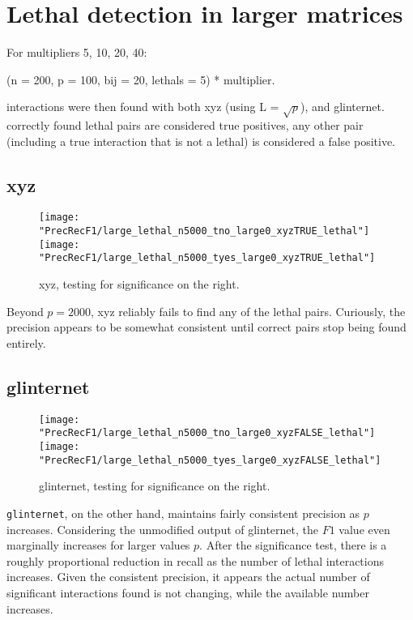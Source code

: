 \documentclass{article}
\begin{document}
\section{Lethal detection in larger matrices}
For multipliers 5, 10, 20, 40:

(n = 200, p = 100, bij = 20, lethals = 5) * multiplier.

interactions were then found with both xyz (using L = $\sqrt{p}$), and glinternet. correctly found lethal pairs are considered true positives, any other pair (including a true interaction that is not a lethal) is considered a false positive.
\subsection{xyz}
\begin{figure}[H]
\begin{minipage}{\linewidth}
	\centering
	\texttt{[image: "PrecRecF1/large\_lethal\_n5000\_tno\_large0\_xyzTRUE\_lethal"]}%
	\texttt{[image: "PrecRecF1/large\_lethal\_n5000\_tyes\_large0\_xyzTRUE\_lethal"]}
\end{minipage}
\caption{xyz, testing for significance on the right.}
\end{figure}

Beyond $p = 2000$, xyz reliably fails to find any of the lethal pairs. Curiously, the precision appears to be somewhat consistent until correct pairs stop being found entirely.

\subsection{glinternet}
\begin{figure}[H]
\begin{minipage}{\linewidth}
	\centering
	\texttt{[image: "PrecRecF1/large\_lethal\_n5000\_tno\_large0\_xyzFALSE\_lethal"]}%
	\texttt{[image: "PrecRecF1/large\_lethal\_n5000\_tyes\_large0\_xyzFALSE\_lethal"]}
\end{minipage}
\caption{glinternet, testing for significance on the right.}
\end{figure}
\verb|glinternet|, on the other hand, maintains fairly consistent precision as $p$ increases. Considering the unmodified output of glinternet, the $F1$ value even marginally increases for larger values $p$. After the significance test, there is a roughly proportional reduction in recall as the number of lethal interactions increases. Given the consistent precision, it appears the actual number of significant interactions found is not changing, while the available number increases.
\end{document}
